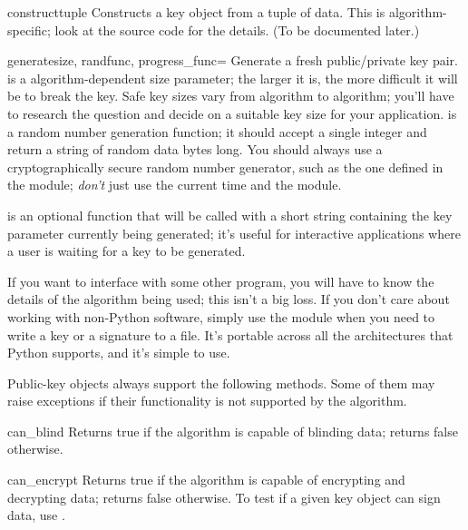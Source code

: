 \documentclass{howto}
\begin{document}
\begin{funcdesc}{construct}{tuple}
Constructs a key object from a tuple of data.  This is
algorithm-specific; look at the source code for the details.  (To be
documented later.)
\end{funcdesc}

\begin{funcdesc}{generate}{size, randfunc, progress_func=}
Generate a fresh public/private key pair.   is a
algorithm-dependent size parameter; the larger it is, the more
difficult it will be to break the key.  Safe key sizes vary from
algorithm to algorithm; you'll have to research the question and
decide on a suitable key size for your application.   is
a random number generation function; it should accept a single integer
 and return a string of random data  bytes long.  You
should always use a cryptographically secure random number generator,
such as the one defined in the  module;
\emph{don't} just use the current time and the  module.

 is an optional function that will be called with a short
string containing the key parameter currently being generated; it's
useful for interactive applications where a user is waiting for a key to
be generated.
\end{funcdesc}

If you want to interface with some other program, you will have to know
the details of the algorithm being used; this isn't a big loss.  If you
don't care about working with non-Python software, simply use the
 module when you need to write a key or a signature to a
file.  It's portable across all the architectures that Python supports,
and it's simple to use.

Public-key objects always support the following methods.  Some of them
may raise exceptions if their functionality is not supported by the
algorithm.

\begin{methoddesc}{can_blind}{}
Returns true if the algorithm is capable of blinding data; 
returns false otherwise.  
\end{methoddesc}

\begin{methoddesc}{can_encrypt}{}
Returns true if the algorithm is capable of encrypting and decrypting
data; returns false otherwise.  To test if a given key object can sign
data, use .
\end{methoddesc}
\end{document}
